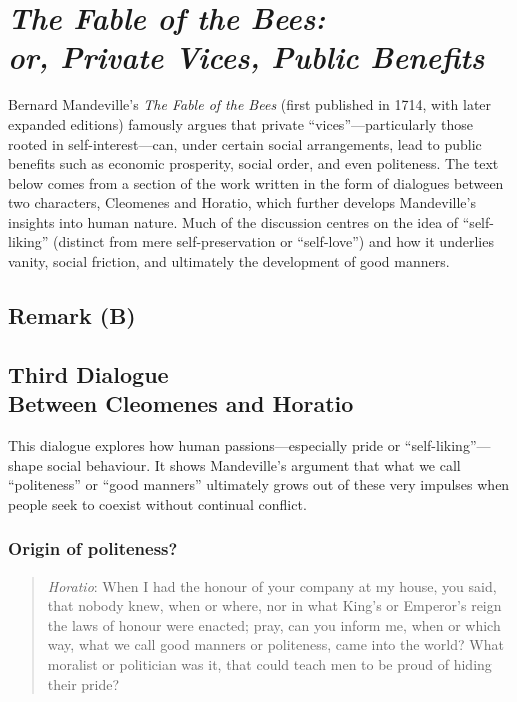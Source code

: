 \section[\textit{The Fable of the Bees}]{\textit{The Fable of the Bees:} \\ \textit{or, Private Vices, Public Benefits}}

    Bernard Mandeville’s \textit{The Fable of the Bees} (first published in 1714, with later expanded editions) famously argues that private “vices”—particularly those rooted in self-interest—can, under certain social arrangements, lead to public benefits such as economic prosperity, social order, and even politeness. The text below comes from a section of the work written in the form of dialogues between two characters, Cleomenes and Horatio, which further develops Mandeville’s insights into human nature. Much of the discussion centres on the idea of “self-liking” (distinct from mere self-preservation or “self-love”) and how it underlies vanity, social friction, and ultimately the development of good manners.

    \subsection{Remark (B)}

    \subsection{Third Dialogue \\ Between Cleomenes and Horatio}

        This dialogue explores how human passions—especially pride or “self-liking”—shape social behaviour. It shows Mandeville’s argument that what we call “politeness” or “good manners” ultimately grows out of these very impulses when people seek to coexist without continual conflict.

        \subsubsection{Origin of politeness?}

            \begin{quote}
                \textit{Horatio}: When I had the honour of your company at my house, you said, that nobody knew, when or where, nor in what King’s or Emperor’s reign the laws of honour were enacted; pray, can you inform me, when or which way, what we call good manners or politeness, came into the world? What moralist or politician was it, that could teach men to be proud of hiding their pride?
            \end{quote}

